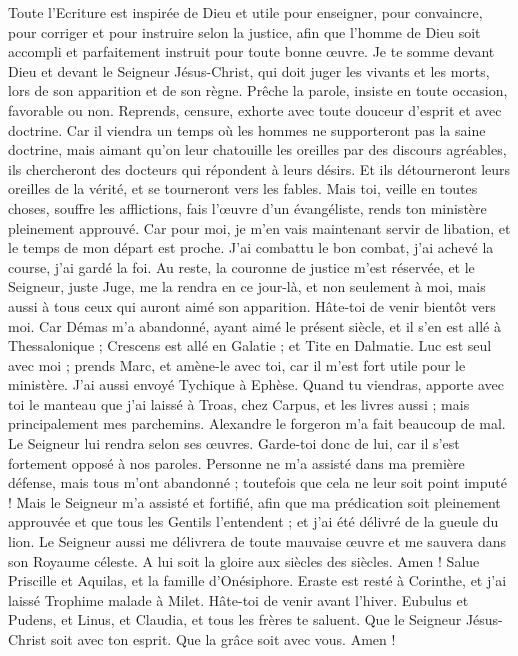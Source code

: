 \begin{multicols}{2}
Toute l'Ecriture est inspirée de Dieu et utile pour enseigner, pour convaincre, pour corriger et pour instruire selon la justice,
afin que l'homme de Dieu soit accompli et parfaitement instruit pour toute bonne œuvre.
\VerseOne{}Je te somme devant Dieu et devant le Seigneur Jésus-Christ, qui doit juger les vivants et les morts, lors de son apparition et de son règne.
Prêche la parole, insiste en toute occasion, favorable ou non. Reprends, censure, exhorte avec toute douceur d'esprit et avec doctrine.
Car il viendra un temps où les hommes ne supporteront pas la saine doctrine, mais aimant qu'on leur chatouille les oreilles par des discours agréables, ils chercheront des docteurs qui répondent à leurs désirs.
Et ils détourneront leurs oreilles de la vérité, et se tourneront vers les fables.
Mais toi, veille en toutes choses, souffre les afflictions, fais l'œuvre d'un évangéliste, rends ton ministère pleinement approuvé.
Car pour moi, je m'en vais maintenant servir de libation, et le temps de mon départ est proche.
J'ai combattu le bon combat, j'ai achevé la course, j'ai gardé la foi.
Au reste, la couronne de justice m'est réservée, et le Seigneur, juste Juge, me la rendra en ce jour-là, et non seulement à moi, mais aussi à tous ceux qui auront aimé son apparition.
Hâte-toi de venir bientôt vers moi.
Car Démas m'a abandonné, ayant aimé le présent siècle, et il s'en est allé à Thessalonique ; Crescens est allé en Galatie ; et Tite en Dalmatie.
Luc est seul avec moi ; prends Marc, et amène-le avec toi, car il m'est fort utile pour le ministère.
J'ai aussi envoyé Tychique à Ephèse.
Quand tu viendras, apporte avec toi le manteau que j'ai laissé à Troas, chez Carpus, et les livres aussi ; mais principalement mes parchemins.
Alexandre le forgeron m'a fait beaucoup de mal. Le Seigneur lui rendra selon ses œuvres.
Garde-toi donc de lui, car il s'est fortement opposé à nos paroles.
Personne ne m'a assisté dans ma première défense, mais tous m'ont abandonné ; toutefois que cela ne leur soit point imputé !
Mais le Seigneur m'a assisté et fortifié, afin que ma prédication soit pleinement approuvée et que tous les Gentils l'entendent ; et j'ai été délivré de la gueule du lion.
Le Seigneur aussi me délivrera de toute mauvaise œuvre et me sauvera dans son Royaume céleste. A lui soit la gloire aux siècles des siècles. Amen !
Salue Priscille et Aquilas, et la famille d'Onésiphore.
Eraste est resté à Corinthe, et j'ai laissé Trophime malade à Milet.
Hâte-toi de venir avant l'hiver. Eubulus et Pudens, et Linus, et Claudia, et tous les frères te saluent.
Que le Seigneur Jésus-Christ soit avec ton esprit. Que la grâce soit avec vous. Amen !
\PPE{}
\end{multicols}
